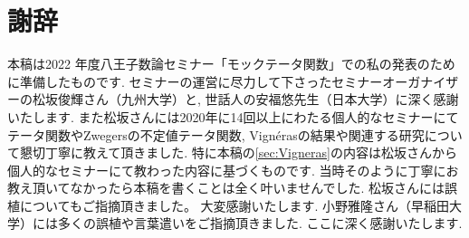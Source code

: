 \documentclass[11pt,b5paper,oneside,lualatex]{ltjsarticle} %
\numberwithin{equation}{section} %
\begin{document}











\section*{謝辞}


本稿は2022 年度八王子数論セミナー「モックテータ関数」での私の発表のために準備したものです. 
セミナーの運営に尽力して下さったセミナーオーガナイザーの松坂俊輝さん（九州大学）と, 世話人の安福悠先生（日本大学）に深く感謝いたします. 
また松坂さんには2020年に14回以上にわたる個人的なセミナーにてテータ関数やZwegersの不定値テータ関数, Vign\'{e}rasの結果や関連する研究について懇切丁寧に教えて頂きました. 
特に本稿の\cref{sec:Vigneras}の内容は松坂さんから個人的なセミナーにて教わった内容に基づくものです. 
当時そのように丁寧にお教え頂いてなかったら本稿を書くことは全く叶いませんでした. 
松坂さんには誤植についてもご指摘頂きました。
大変感謝いたします. 
小野雅隆さん（早稲田大学）には多くの誤植や言葉遣いをご指摘頂きました.
ここに深く感謝いたします.





\end{document}
